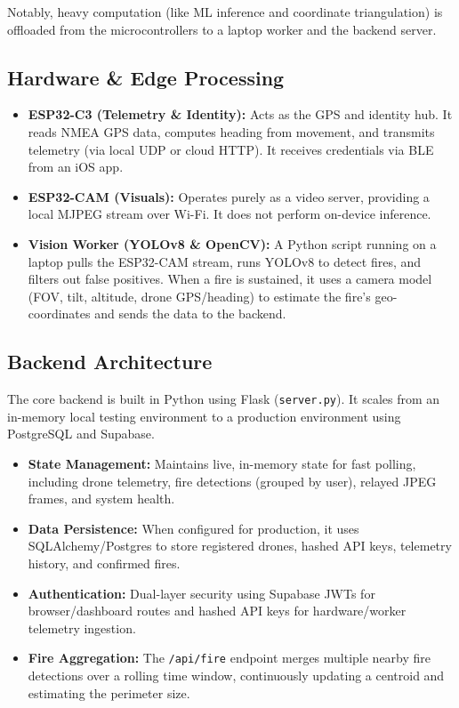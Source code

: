 \documentclass[journal, onecolumn]{IEEEtran}
\begin{document}
Notably, heavy computation (like ML inference and coordinate triangulation) is offloaded from the microcontrollers to a laptop worker and the backend server.

\subsection{Hardware \& Edge Processing}
\begin{itemize}
    \item \textbf{ESP32-C3 (Telemetry \& Identity):} Acts as the GPS and identity hub. It reads NMEA GPS data, computes heading from movement, and transmits telemetry (via local UDP or cloud HTTP). It receives credentials via BLE from an iOS app.
    \item \textbf{ESP32-CAM (Visuals):} Operates purely as a video server, providing a local MJPEG stream over Wi-Fi. It does not perform on-device inference.
    \item \textbf{Vision Worker (YOLOv8 \& OpenCV):} A Python script running on a laptop pulls the ESP32-CAM stream, runs YOLOv8 to detect fires, and filters out false positives. When a fire is sustained, it uses a camera model (FOV, tilt, altitude, drone GPS/heading) to estimate the fire's geo-coordinates and sends the data to the backend.
\end{itemize}

\subsection{Backend Architecture}
The core backend is built in Python using Flask (\texttt{server.py}). It scales from an in-memory local testing environment to a production environment using PostgreSQL and Supabase.

\begin{itemize}
    \item \textbf{State Management:} Maintains live, in-memory state for fast polling, including drone telemetry, fire detections (grouped by user), relayed JPEG frames, and system health.
    \item \textbf{Data Persistence:} When configured for production, it uses SQLAlchemy/Postgres to store registered drones, hashed API keys, telemetry history, and confirmed fires.
    \item \textbf{Authentication:} Dual-layer security using Supabase JWTs for browser/dashboard routes and hashed API keys for hardware/worker telemetry ingestion.
    \item \textbf{Fire Aggregation:} The \texttt{/api/fire} endpoint merges multiple nearby fire detections over a rolling time window, continuously updating a centroid and estimating the perimeter size.
\end{itemize}
\end{document}
